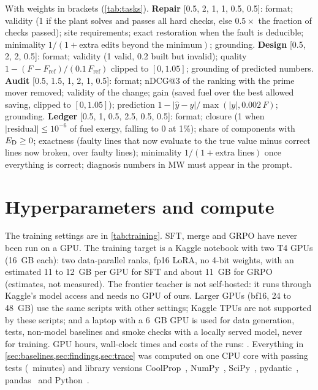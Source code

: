 With weights in brackets (\cref{tab:tasks}). \textbf{Repair} [0.5, 2, 1, 1, 0.5, 0.5]: format; validity (1 if the plant solves and passes all hard checks, else $0.5\times$ the fraction of checks passed); site requirements; exact restoration when the fault is deducible; minimality $1/(1+\text{extra edits beyond the minimum})$; grounding.
\textbf{Design} [0.5, 2, 2, 0.5]: format; validity (1 valid, 0.2 built but invalid); quality $1-(F-F_{\mathrm{ref}})/(0.1\,F_{\mathrm{ref}})$ clipped to $[0,1.05]$; grounding of predicted numbers.
\textbf{Audit} [0.5, 1.5, 1, 2, 1, 0.5]: format; nDCG@3 of the ranking with the prime mover removed; validity of the change; gain (saved fuel over the best allowed saving, clipped to $[0,1.05]$); prediction $1-|\hat y-y|/\max(|y|,0.002\,F)$; grounding.
\textbf{Ledger} [0.5, 1, 0.5, 2.5, 0.5, 0.5]: format; closure (1 when $|\text{residual}|\le10^{-6}$ of fuel exergy, falling to 0 at 1\%); share of components with $E_{\mathrm{D}}\ge0$; exactness (faulty lines that now evaluate to the true value minus correct lines now broken, over faulty lines); minimality $1/(1+\text{extra lines})$ once everything is correct; diagnosis numbers in MW must appear in the prompt.

\section{Hyperparameters and compute}\label{app:compute}

The training settings are in \cref{tab:training}. SFT, merge and GRPO have never been run on a GPU. The training target is a Kaggle notebook with two T4 GPUs (16~GB each): two data-parallel ranks, fp16 LoRA, no 4-bit weights, with an estimated 11 to 12~GB per GPU for SFT and about 11~GB for GRPO (estimates, not measured). The frontier teacher is not self-hosted: it runs through Kaggle's model access and needs no GPU of ours. Larger GPUs (bf16, 24 to 48~GB) use the same scripts with other settings; Kaggle TPUs are not supported by these scripts; and a laptop with a 6~GB GPU is used for data generation, tests, non-model baselines and smoke checks with a locally served model, never for training.
GPU hours, wall-clock times and costs of the runs: .
Everything in \cref{sec:baselines,sec:findings,sec:trace} was computed on one CPU core with  passing tests (~minutes) and library versions CoolProp~, NumPy~, SciPy~, pydantic~, pandas~ and Python~.

